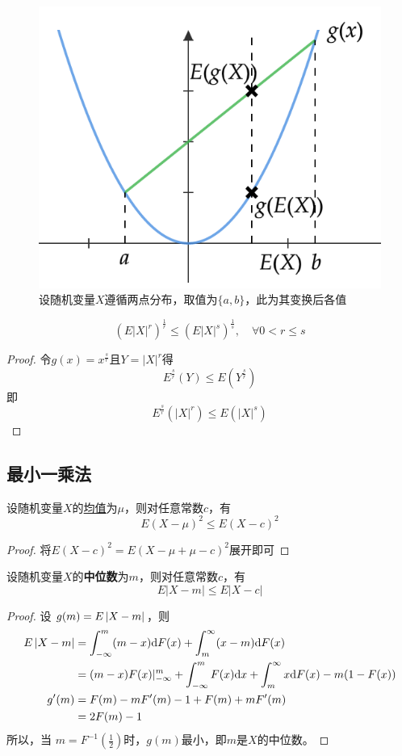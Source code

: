 \begin{figure}[h]
    \centering
    \includegraphics{image/trans_mean.png}
    \caption{设随机变量$X$遵循两点分布，取值为$\{ a,b \}$，此为其变换后各值}
\end{figure}

\begin{lemma}
    \[ (E|X|^r)^{\frac{1}{r}} \le (E|X|^s)^{\frac{1}{s}} ,\quad \forall 0<r \le s \]
\end{lemma}
\begin{proof}
    令$g(x)=x^{\frac{s}{r}}$且$Y=|X|^r$得
    \[ E^{\frac{s}{r}}(Y) \le E(Y^{\frac{s}{r}}) \]
    即
    \[ E^{\frac{s}{r}}(|X|^r) \le E(|X|^s) \]
\end{proof}

\subsection{最小一乘法}

\begin{proposition}
    设随机变量$X$的\underline{均值}为$\mu$，则对任意常数$c$，有
    \[ E(X-\mu)^2 \le E(X-c)^2 \]
\end{proposition}
\begin{proof}
    将$E(X-c)^2=E(X-\mu+\mu-c)^2$展开即可
\end{proof}

\begin{proposition}
    设随机变量$X$的\textbf{中位数}为$m$，则对任意常数$c$，有
    \[ E|X-m| \le E|X-c| \]
\end{proposition}
\begin{proof}
    设 $g(m)=E\left\lvert X-m\right\rvert$，则
    \begin{align*}
        E\left\lvert X-m\right\rvert &= \int^m_{-\infty}(m-x)\mathrm{d} F(x) + \int_m^{\infty}(x-m)\mathrm{d} F(x) \\
        &= (m-x)F(x)|^m_{-\infty} + \int^m_{-\infty} F(x) \mathrm{d} x + \int_m^{\infty}x\mathrm{d} F(x) - m(1-F(x)) \\
        g'(m) &= F(m) - mF'(m) -1 +F(m)+mF'(m) \\
        &=2F(m)-1
    \end{align*}
    所以，当 $m=F^{-1}(\frac{1}{2})$时，$g(m)$最小，即$m$是$X$的中位数。
\end{proof}

